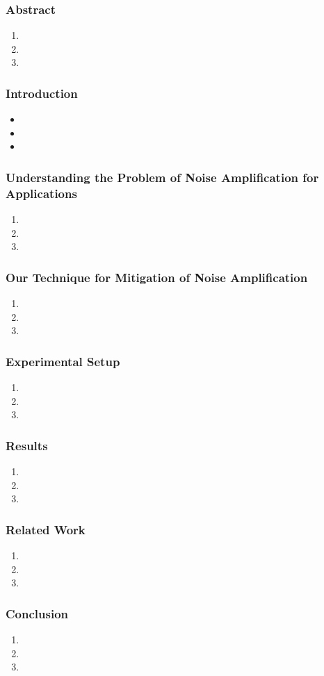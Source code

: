 \begin{frame}
\frametitle{Abstract}
\begin{enumerate} 
\item \small 
\item \small
\item \small 
\end{enumerate} 
\end{frame}

\begin{frame}
\frametitle{Introduction} 
\begin{itemize}
\item \small 
\item \small 
\item \small 
\end{itemize} 
\end{frame} 

\begin{frame}
\frametitle{Understanding the Problem of Noise Amplification for Applications}  
\begin{enumerate}
\item \small 
\item \small 
\item \small 
\end{enumerate} 
\end{frame}

\begin{frame}
\frametitle{Our Technique for Mitigation of Noise Amplification}  
\begin{enumerate} 
\item \small 
\item \small 
\item \small 
\end{enumerate}
\end{frame}

\begin{frame}
\frametitle{Experimental Setup}
\begin{enumerate}
\item \small
\item \small 
\item \small 
\end{enumerate} 
\end{frame}


\begin{frame}
\frametitle{Results}
\begin{enumerate}
\item \small
\item \small 
\item \small 
\end{enumerate} 
\end{frame}


\begin{frame}
\frametitle{Related Work}
\begin{enumerate}
\item \small
\item \small 
\item \small 
\end{enumerate} 
\end{frame}

\begin{frame}
\frametitle{Conclusion}
\begin{enumerate}
\item \small
\item \small 
\item \small 
\end{enumerate} 
\end{frame}

